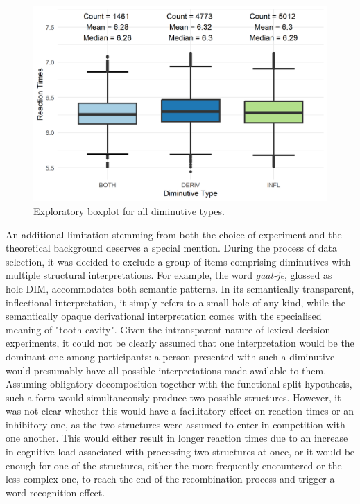 \begin{figure}[ht]
    \centering
    \includegraphics[width=\textwidth]{images/both_box.png}
    \caption[Exploratory boxplot for all diminutive types]{Exploratory boxplot for all diminutive types.}
    \label{fig:boxplot_both}
\end{figure}

An additional limitation stemming from both the choice of experiment and the theoretical background deserves a special mention. During the process of data selection, it was decided to exclude a group of items comprising diminutives with multiple structural interpretations. For example, the word \textit{gaat-je}, glossed as hole-DIM, accommodates both semantic patterns. In its semantically transparent, inflectional interpretation, it simply refers to a small hole of any kind, while the semantically opaque derivational interpretation comes with the specialised meaning of "tooth cavity". Given the intransparent nature of lexical decision experiments, it could not be clearly assumed that one interpretation would be the dominant one among participants: a person presented with such a diminutive would presumably have all possible interpretations made available to them. Assuming obligatory decomposition together with the functional split hypothesis, such a form would simultaneously produce two possible structures. However, it was not clear whether this would have a facilitatory effect on reaction times or an inhibitory one, as the two structures were assumed to enter in competition with one another. This would either result in longer reaction times due to an increase in cognitive load associated with processing two structures at once, or it would be enough for one of the structures, either the more frequently encountered or the less complex one, to reach the end of the recombination process and trigger a word recognition effect. 


